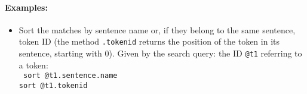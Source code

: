 \documentclass[12pt]{scrartcl}
\begin{document}
\paragraph*{Examples:}
\begin{itemize}
	\item Sort the matches by sentence name or, if they belong to the same sentence, token ID (the method \texttt{.tokenid} returns the position of the token in its sentence, starting with 0). Given by the search query: the ID \texttt{@t1} referring to a token:\\
	{\tt
	sort @t1.sentence.name\\[-.4ex]
	sort @t1.tokenid\\[-.4ex]
	}
\end{itemize}
\end{document}
